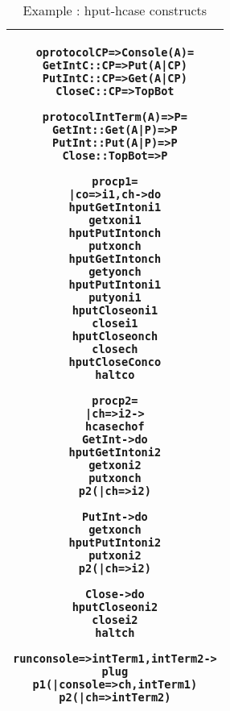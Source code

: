 \documentclass[11pt]{article}
\newcommand{\<}{\langle}
\renewcommand{\>}{\rangle}
\begin{document}
\begin{table}[h!]
\begin{center}
\begin{tabular}{|c|} \hline
\begin{minipage}{3.2in}
{
\begin{alltt}

oprotocol CP => Console (A) =
    GetIntC   :: CP => Put (A|CP)  
    PutIntC   :: CP => Get (A|CP) 
    CloseC    :: CP => TopBot  

protocol IntTerm (A) => P =
    GetInt   :: Get (A|P) => P 
    PutInt   :: Put (A|P) => P
    Close    :: TopBot    => P  

proc p1 = 
    | co => i1,ch -> do 
        hput GetInt on i1 
        get x on i1 
        hput PutInt on ch 
        put x on ch 
        hput GetInt on ch 
        get y on ch 
        hput PutInt on i1 
        put y on i1 
        hput Close on i1 
        close i1 
        hput Close on ch 
        close ch 
        hput CloseC on co 
        halt co 

proc p2 = 
    | ch => i2 -> 
        hcase ch of 
            GetInt -> do 
                hput GetInt on i2  
                get x on i2 
                put x on ch 
                p2 ( | ch => i2)

            PutInt -> do 
                get x on ch 
                hput PutInt on i2 
                put x on i2
                p2 ( | ch => i2)

            Close  -> do 
                hput Close on i2 
                close i2
                halt ch 

run console => intTerm1,intTerm2 -> 
      plug 
         p1 ( | console => ch,intTerm1)
         p2 ( | ch => intTerm2)
 
\end{alltt}

} 
\end {minipage} 
\tabularnewline
\hline
\end{tabular}
\caption{Example : {\sf hput-hcase} constructs}
\label{Conc : hcaseExample}
\end{center}
\end{table}
\end{document}
